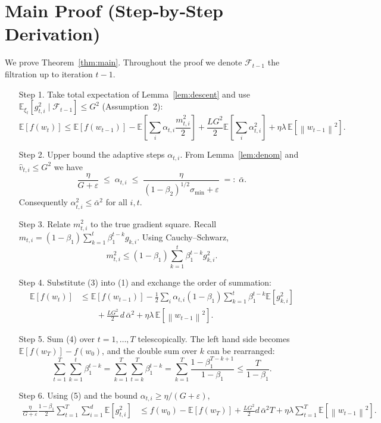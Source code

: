 \documentclass{article}
\newcommand{\E}{\mathbb{E}}
\newcommand{\norm}[1]{\left\|#1\right\|}
\begin{document}
\section*{Main Proof (Step‑by‑Step Derivation)}
We prove Theorem~\ref{thm:main}. Throughout the proof we denote
$\mathcal{F}_{t-1}$ the filtration up to iteration $t-1$.

\begin{enumerate}
\item[Step 1.]  Take total expectation of Lemma~\ref{lem:descent} and use
$\E_{\xi_{t}}[g_{t,i}^{2}\mid\mathcal{F}_{t-1}]\le G^{2}$ (Assumption~2):
\[
\E[f(w_{t})]\le\E[f(w_{t-1})]
-\E\!\left[\sum_{i}\alpha_{t,i}\frac{m_{t,i}^{2}}{2}\right]
+\frac{L G^{2}}{2}\E\!\left[\sum_{i}\alpha_{t,i}^{2}\right]
+\eta\lambda\,\E\!\left[\norm{w_{t-1}}^{2}\right].
\tag{1}
\]

\item[Step 2.]  Upper bound the adaptive steps $\alpha_{t,i}$.
From Lemma~\ref{lem:denom} and $\hat v_{t,i}\le G^{2}$ we have
\[
\frac{\eta}{G+\varepsilon}\;\le\;\alpha_{t,i}\;\le\;
\frac{\eta}{(1-\beta_{2})^{1/2}\sigma_{\min}+\varepsilon}
\;=: \; \bar\alpha.
\tag{2}
\]
Consequently $\alpha_{t,i}^{2}\le\bar\alpha^{2}$ for all $i,t$.

\item[Step 3.]  Relate $m_{t,i}^{2}$ to the true gradient square.
Recall $m_{t,i}= (1-\beta_{1})\sum_{k=1}^{t}\beta_{1}^{t-k}g_{k,i}$.
Using Cauchy–Schwarz,
\[
m_{t,i}^{2}\le (1-\beta_{1})\sum_{k=1}^{t}\beta_{1}^{t-k}g_{k,i}^{2}.
\tag{3}
\]

\item[Step 4.]  Substitute (3) into (1) and exchange the order of summation:
\[
\begin{aligned}
\E[f(w_{t})] &\le \E[f(w_{t-1})]
-\frac{1}{2}\sum_{i}\alpha_{t,i}(1-\beta_{1})
        \sum_{k=1}^{t}\beta_{1}^{t-k}\E[g_{k,i}^{2}]\\
&\qquad+\frac{L G^{2}}{2}\,d\,\bar\alpha^{2}
+\eta\lambda\,\E[\norm{w_{t-1}}^{2}].
\end{aligned}
\tag{4}
\]

\item[Step 5.]  Sum (4) over $t=1,\dots,T$ telescopically. The left hand side
becomes $\E[f(w_{T})]-f(w_{0})$, and the double sum over $k$ can be rearranged:
\[
\sum_{t=1}^{T}\sum_{k=1}^{t}\beta_{1}^{t-k}
   =\sum_{k=1}^{T}\sum_{t=k}^{T}\beta_{1}^{t-k}
   =\sum_{k=1}^{T}\frac{1-\beta_{1}^{T-k+1}}{1-\beta_{1}}
   \le \frac{T}{1-\beta_{1}}.
\tag{5}
\]

\item[Step 6.]  Using (5) and the bound $\alpha_{t,i}\ge\eta/(G+\varepsilon)$,
\[
\begin{aligned}
\frac{\eta}{G+\varepsilon}\frac{1-\beta_{1}}{2}
\sum_{t=1}^{T}\sum_{i=1}^{d}\E[g_{t,i}^{2}]
&\le f(w_{0})- \E[f(w_{T})]
+ \frac{L G^{2}}{2}d\,\bar\alpha^{2}T
+ \eta\lambda\sum_{t=1}^{T}\E[\norm{w_{t-1}}^{2}] .
\end{aligned}
\tag{6}
\]


\end{enumerate}
\end{document}
